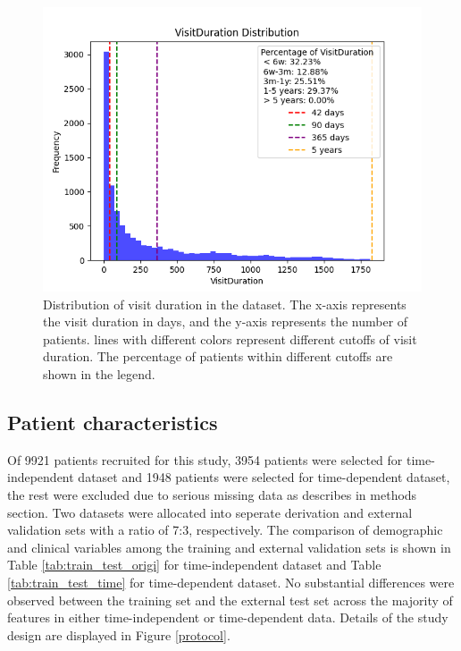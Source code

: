 \documentclass[final,3p,times,authoryear]{elsarticle}
\begin{document}
\begin{figure}[t]
    \centering
    \includegraphics[width=0.8\linewidth]{figures/outcome_distribution.png}
    \caption{Distribution of visit duration in the dataset. The x-axis represents the visit duration in days, and the y-axis represents the number of patients. lines with different colors represent different cutoffs of visit duration. The percentage of patients within different cutoffs are shown in the legend.}\label{visit_duration}
\end{figure}


\subsection{Patient characteristics}\label{PatientCharacteristics}


Of 9921 patients recruited for this study, 3954 patients were selected for time-independent dataset and 1948 patients were selected for time-dependent dataset, the rest were excluded due to serious missing data as describes in methods section. Two datasets were allocated into seperate derivation and external validation sets with a ratio of 7:3, respectively. The comparison of demographic and clinical variables among the training and external validation sets is shown in Table \ref{tab:train_test_origi} for time-independent dataset and Table \ref{tab:train_test_time} for time-dependent dataset. No substantial differences were observed between the training set and the external test set across the majority of features in either time-independent or time-dependent data. Details of the study design are displayed in Figure \ref{protocol}.
\end{document}
